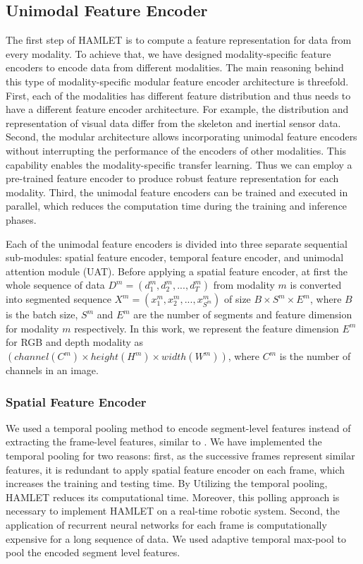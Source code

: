 \documentclass[runningheads]{llncs}
\newcommand{\pa}{HAMLET}
\begin{document}
\subsection{Unimodal Feature Encoder}
The first step of {\pa} is to compute a feature representation for data from every modality. To achieve that, we have designed modality-specific feature encoders to encode data from different modalities. The main reasoning behind this type of modality-specific modular feature encoder architecture is threefold. First, each of the modalities has different feature distribution and thus needs to have a different feature encoder architecture. For example, the distribution and representation of visual data differ from the skeleton and inertial sensor data. Second, the modular architecture allows incorporating unimodal feature encoders without interrupting the performance of the encoders of other modalities. This capability enables the modality-specific transfer learning. Thus we can employ a pre-trained feature encoder to produce robust feature representation for each modality. Third, the unimodal feature encoders can be trained and executed in parallel, which reduces the computation time during the training and inference phases.





Each of the unimodal feature encoders is divided into three separate sequential sub-modules: spatial feature encoder, temporal feature encoder, and unimodal attention module (UAT). Before applying a spatial feature encoder, at first the whole sequence of data $D^m=(d_1^m,d_2^m,...,d_T^m)$ from modality $m$ is converted into segmented sequence $X^m=(x_1^m,x_2^m,...,x_{S^m}^m)$ of size $B\times S^m \times E^m$, where $B$ is the batch size, $S^m$ and $E^m$ are the number of segments and feature dimension for modality $m$ respectively. In this work, we represent the feature dimension $E^m$ for RGB and depth modality as $(channel(C^m) \times height(H^m) \times width(W^m))$, where $C^m$ is the number of channels in an image. 

\subsubsection{Spatial Feature Encoder}
We used a temporal pooling method to encode segment-level features instead of extracting the frame-level features, similar to \cite{keyless}. We have implemented the temporal pooling for two reasons: first, as the successive frames represent similar features, it is redundant to apply spatial feature encoder on each frame, which increases the training and testing time. By Utilizing the temporal pooling, {\pa} reduces its computational time. Moreover, this polling approach is necessary to implement {\pa} on a real-time robotic system. Second, the application of recurrent neural networks for each frame is computationally expensive for a long sequence of data. We used adaptive temporal max-pool to pool the encoded segment level features. 
\end{document}
